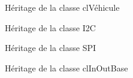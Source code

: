 \documentclass[10pt,a4paper,final]{article}
\begin{document}
\begin{spacing}{1.5}
\begin{figure}[hbtp]
\caption{Héritage de la classe clVéhicule}
\centering
{}
\end{figure}
\begin{figure}[hbtp]
\caption{Héritage de la classe I2C}
\centering
{}
\end{figure}
\begin{figure}[hbtp]
\caption{Héritage de la classe SPI}
\centering
{}
\end{figure}
\begin{figure}[hbtp]
\caption{Héritage de la classe clInOutBase}
\centering
{}
\end{figure}
\vfill
\pagebreak


\end{spacing}
\end{document}
